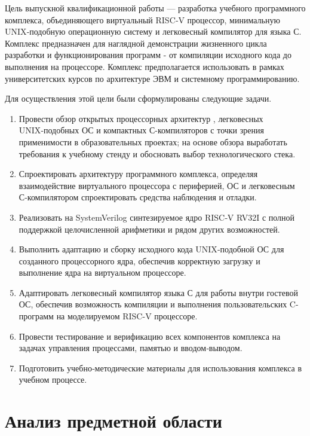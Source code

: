 Цель выпускной квалификационной работы — разработка учебного программного комплекса, объединяющего виртуальный RISC‑V процессор, минимальную UNIX‑подобную операционную систему и легковесный компилятор для языка С. Комплекс предназначен для наглядной демонстрации жизненного цикла разработки и функционирования программ - от компиляции исходного кода до выполнения на процессоре. Комплекс предполагается использовать в рамках университетских курсов по архитектуре ЭВМ и системному программированию.

Для осуществления этой цели были сформулированы следующие задачи.

\begin{enumerate}
    \item Провести обзор открытых процессорных архитектур , легковесных UNIX‑подобных ОС и компактных С-компиляторов с точки зрения применимости в образовательных проектах; на основе обзора выработать требования к учебному стенду и обосновать выбор технологического стека.
    \item Спроектировать  архитектуру программного комплекса, определяя взаимодействие виртуального процессора с периферией, ОС и легковесным С-компилятором спроектировать средства наблюдения и отладки.
    \item Реализовать на SystemVerilog синтезируемое ядро RISC‑V RV32I с полной поддержкой целочисленной арифметики и рядом других возможностей.
    \item Выполнить адаптацию и сборку исходного кода UNIX‑подобной ОС для созданного процессорного ядра, обеспечив корректную загрузку и выполнение ядра на виртуальном процессоре.
    \item Адаптировать легковесный компилятор языка С для работы внутри гостевой ОС, обеспечив возможность компиляции и выполнения пользовательских C-программ на моделируемом RISC-V процессоре.
    \item Провести тестирование и верификацию всех компонентов комплекса на задачах управления процессами, памятью и вводом‑выводом.
    \item Подготовить учебно‑методические материалы для использования комплекса в учебном процессе.
\end{enumerate}



\section{Анализ предметной области}
\label{sec:relatedworks}

